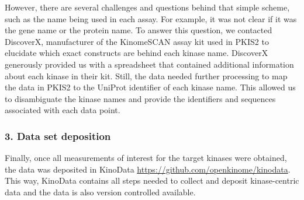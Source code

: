 \documentclass[9pt,lessons]{livecoms}
\begin{document}
However, there are several challenges and questions behind that simple scheme, such as the name being used in each assay. For example, it was not clear if it was the gene name or the protein name. To answer this question, we contacted DiscoverX, manufacturer of the KinomeSCAN assay kit used in PKIS2 to elucidate which exact constructs are behind each kinase name. DiscoverX generously provided us with a spreadsheet that contained additional information about each kinase in their kit. 
Still, the data needed further processing to map the data in PKIS2 to the UniProt identifier of each kinase name. This allowed us to disambiguate the kinase names and provide the identifiers and sequences associated with each data point.

\subsubsection{3. Data set deposition}

Finally, once all measurements of interest for the target kinases were obtained, the data was deposited in KinoData \url{https://github.com/openkinome/kinodata}. This way, KinoData contains all steps needed to collect and deposit kinase-centric data and the data is also version controlled available.
\end{document}
